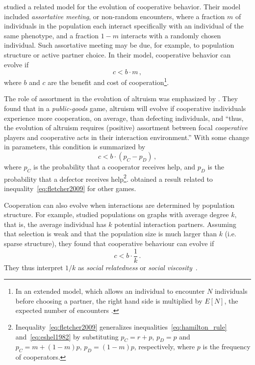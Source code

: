 \documentclass[12pt]{extarticle}
\begin{document}
\citet{Eshel1982} studied a related model for the evolution of cooperative behavior.
Their model included \emph{assortative meeting}, or non-random encounters, where a fraction $m$ of individuals in the population each interact specifically with an individual of the same phenotype, and a fraction $1-m$ interacts  with a randomly chosen individual.  
Such assortative meeting may be due, for example, to population structure or active partner choice.
In their model, cooperative behavior can evolve if
\citep[eq.~3.2]{Eshel1982}
\begin{equation} \label{eq:eshel1982}
c < b \cdot m \,,
\end{equation}
where $b$ and $c$ are the benefit and cost of cooperation\footnote{In an extended model, which allows an individual to encounter $N$ individuals before choosing a partner, the right hand side is multiplied by $E[N]$, the expected number of encounters \citep[eq.~4.6]{Eshel1982}.
}. 

The role of assortment in the evolution of altruism was emphasized by \citet{Fletcher2009assortment}.
They found that in a \emph{public-goods} game, altruism will evolve if cooperative individuals experience more cooperation, on average, than defecting individuals, and ``thus, the evolution of altruism requires (positive) assortment between focal \emph{cooperative} players and cooperative acts in their interaction environment.''
With some change in parameters, this condition is summarized by \citep[eq.~2.3]{Fletcher2009assortment}
\begin{equation} \label{eq:fletcher2009}
c < b \cdot (p_C - p_D ) \,,
\end{equation}
where $p_C$ is the probability that a cooperator receives help, and $p_D$ is the probability that a defector receives help\footnote{Inequality~\ref{eq:fletcher2009} generalizes inequalities~\ref{eq:hamilton_rule} and~\ref{eq:eshel1982} by substituting $p_C=r + p$, $p_D=p$ and $p_C=m + (1-m)p$, $p_D=(1-m)p$, respectively, where $p$ is the frequency of cooperators.}.
\citet{Bijma2010assortment} obtained a result related to inequality~\ref{eq:fletcher2009} for other games.

Cooperation can also evolve when interactions are determined by population structure. For example, \citet{Ohtsuki2006} studied populations on graphs with average degree $k$, that is, the average individual has $k$ potential interaction partners. Assuming that selection is weak and that the population size is much larger than $k$ (i.e. sparse structure), they found that cooperative behaviour can evolve if~\citep{Ohtsuki2006}
\begin{equation} \label{eq:ohtsuki2006}
c < b \cdot \frac{1}{k} \,.
\end{equation}
They thus interpret $1/k$ as \emph{social relatedness} or \emph{social viscosity}~\citep{Ohtsuki2006}.
\end{document}
